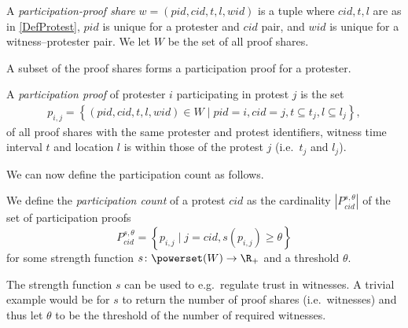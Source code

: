 \begin{frame}
\begin{definition}
  A \emph{participation-proof share} \(w = (pid, cid, t, l, wid)\) is a tuple 
  where
  \(cid, t, l\) are as in \cref{DefProtest},
  \(pid\) is unique for a protester and \(cid\) pair, and
  \(wid\) is unique for a witness--protester pair.
  We let \(W\) be the set of all proof shares.
\end{definition}
\end{frame}

A subset of the proof shares forms a participation proof for a protester.

\begin{frame}
\begin{definition}
  A \emph{participation proof} of protester \(i\) participating in protest \(j\) 
  is the set
  \begin{align}
    \nonumber
    p_{i, j} =
    \left\{ (pid, cid, t, l, wid)\in W \mid
    pid = i, cid = j,
    t \subseteq t_j, l\subseteq l_j \right\},
  \end{align}
  of all proof shares with the same protester and protest identifiers, witness 
  time interval \(t\) and location \(l\) is within those of the protest \(j\) 
  (i.e.\ \(t_j\) and \(l_j\)).
\end{definition}
\end{frame}

We can now define the participation count as follows.
\begin{frame}
\begin{definition}
  We define the \emph{participation count} of a protest \(cid\) as the 
  cardinality \(|P_{cid}^{s,\theta}|\) of the set of participation proofs \[
    P_{cid}^{s,\theta} = \left\{ p_{i,j} \mid
      j = cid, s(p_{i,j})\geq \theta \right\}
  \] for some strength function \(s\colon \powerset(W)\to \R_+\) and a threshold 
  \(\theta\).
\end{definition}

\pause{}

\end{frame}

The strength function \(s\) can be used to e.g.\ regulate trust in 
witnesses.
A trivial example would be for \(s\) to return the number of proof shares (i.e.\ 
witnesses) and thus let \(\theta\) to be the threshold of the number of required 
witnesses.
